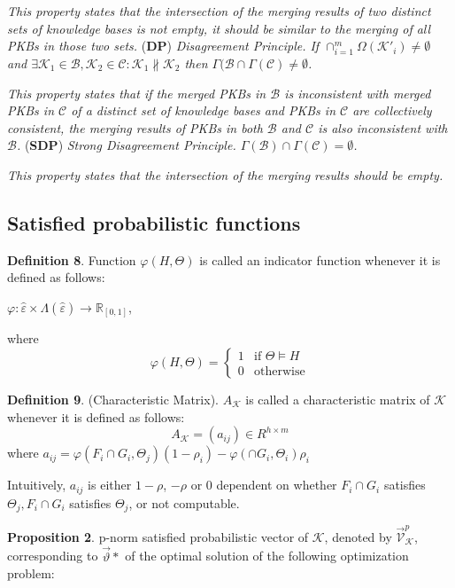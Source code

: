 \documentclass[]{iosart2c}
\begin{document}
  \textit{This property states that the intersection of the merging results of two distinct sets of knowledge bases is not empty, it should be similar to the merging of all PKBs in those two sets.
  }
  (\textbf{DP}) \textit{Disagreement Principle. If $\cap^m_{i=1}\Omega(\mathcal{K}'_i) \neq \emptyset$ and $\exists \mathcal{K}_1 \in \mathcal{B}, \mathcal{K}_2 \in \mathcal{C}: \mathcal{K}_1 \nparallel \mathcal{K}_2$ then $\Gamma(\mathcal{B} \cap \Gamma(\mathcal{C}) \neq \emptyset$.}

  \textit{This property states that if the merged PKBs in $\mathcal{B}$ is inconsistent with merged PKBs in $\mathcal{C}$ of a distinct set of knowledge bases and PKBs in $\mathcal{C}$ are collectively consistent, the merging results of PKBs in both $\mathcal{B}$ and $\mathcal{C}$ is also inconsistent with $\mathcal{B}$.
  }
  (\textbf{SDP}) \textit{Strong Disagreement Principle. $\Gamma(\mathcal{B}) \cap \Gamma(\mathcal{C}) = \emptyset$.}

  \textit{This property states that the intersection of the merging results should be empty.
  }

  \subsection{Satisfied probabilistic functions}

  \textbf{Definition 8}. Function $\varphi(H,\Theta)$ is called an indicator function whenever it is defined as follows:

  $\varphi : \hat{\varepsilon} \times \Lambda(\hat{\varepsilon}) \to \mathbb{R}_{[0,1]}$,

  where $$\varphi(H,\Theta) =
  \begin{cases}
    1    &\text{if $\Theta \models H$} \\
    0    &\text{otherwise}
  \end{cases}
  $$

  \textbf{Definition 9}. (Characteristic Matrix). $A_\mathcal{K}$ is called a characteristic matrix of $\mathcal{K}$ whenever it is defined as follows:
  $$
  A_\mathcal{K} = (a_{ij}) \in R^{h \times m}
  $$
  where
  $a_{ij} = \varphi(F_i \cap G_i,\Theta_j)(1 - \rho_i) - \varphi(\cap G_i,\Theta_i)\rho_i$

  Intuitively, $a_{ij}$ is either $1-\rho$, $-\rho$ or 0 dependent on whether $F_i \cap G_i$ satisfies $\Theta_j, F_i \cap G_i$ satisfies $\Theta_j$, or not computable.

  \textbf{Proposition 2}. p-norm satisfied probabilistic vector of $\mathcal{K}$, denoted by $\vec{\mathcal{V}}^p_\mathcal{K}$, corresponding to $\vec{\vartheta}*$ of the optimal solution of the following optimization problem:
\end{document}
